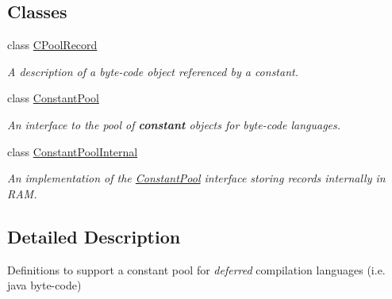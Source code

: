 \subsection*{Classes}
\begin{DoxyCompactItemize}
\item 
class \mbox{\hyperlink{class_c_pool_record}{C\+Pool\+Record}}
\begin{DoxyCompactList}\small\item\em A description of a byte-\/code object referenced by a constant. \end{DoxyCompactList}\item 
class \mbox{\hyperlink{class_constant_pool}{Constant\+Pool}}
\begin{DoxyCompactList}\small\item\em An interface to the pool of {\bfseries{constant}} objects for byte-\/code languages. \end{DoxyCompactList}\item 
class \mbox{\hyperlink{class_constant_pool_internal}{Constant\+Pool\+Internal}}
\begin{DoxyCompactList}\small\item\em An implementation of the \mbox{\hyperlink{class_constant_pool}{Constant\+Pool}} interface storing records internally in R\+AM. \end{DoxyCompactList}\end{DoxyCompactItemize}


\subsection{Detailed Description}
Definitions to support a constant pool for {\itshape deferred} compilation languages (i.\+e. java byte-\/code) 

